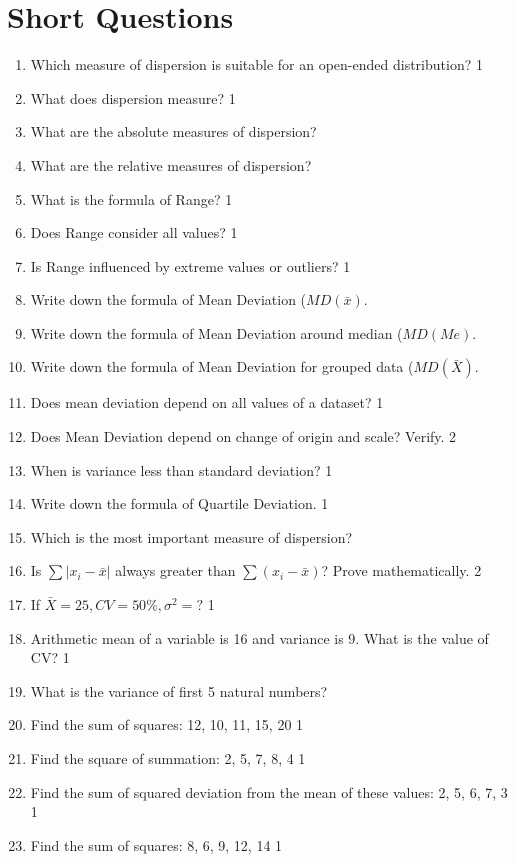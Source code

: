 \documentclass[a4paper,oneside]{book}
\begin{document}
\section{Short Questions}

 \begin{enumerate}
 
 \item Which measure of dispersion is suitable for an open-ended distribution?  \hfill 1
 \item What does dispersion measure?  \hfill 1
 \item What are the absolute measures of dispersion?
 \item What are the relative measures of dispersion?
 \item What is the formula of Range? \hfill 1
 \item Does Range consider all values? \hfill 1
 \item Is Range influenced by extreme values or outliers? \hfill 1
 \item Write down the formula of Mean Deviation ($MD(\bar x)$.
 \item Write down the formula of Mean Deviation around median ($MD(Me)$.
 \item Write down the formula of Mean Deviation for grouped data ($MD(\bar X)$.
 \item Does mean deviation depend on all values of a dataset? \hfill 1
 \item Does Mean Deviation depend on change of origin and scale? Verify. \hfill 2
  \item When is variance less than standard deviation? \hfill 1
  \item Write down the formula of Quartile Deviation. \hfill 1
 \item Which is the most important measure of dispersion?
   \item Is $\sum |x_i-\bar x|$ always greater than $\sum (x_i-\bar x)$? Prove mathematically. \hfill 2
   \item If $\bar X = 25, CV = 50\%, \sigma^2=?$ \hfill 1
   \item Arithmetic mean of a variable is 16 and variance is 9. What is the value of CV? \hfill 1 
   \item What is the variance of first 5 natural numbers?
 
 \item Find the sum of squares: 12, 10, 11, 15, 20 \hfill 1
 \item Find the square of summation: 2, 5, 7, 8, 4 \hfill 1
 \item Find the sum of squared deviation from the mean of these values: 2, 5, 6, 7, 3 \hfill 1
 \item Find the sum of squares: 8, 6, 9, 12, 14 \hfill 1  


\end{enumerate}
\end{document}
